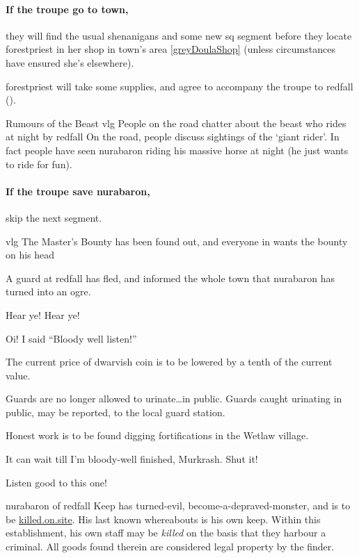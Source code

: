 
\paragraph{If the troupe go to \gls{town},}
they will find the usual shenanigans and some new \gls{sq} \gls{segment} before they locate \gls{forestpriest} in her shop in \gls{town}'s area \vref{greyDoulaShop} (unless circumstances have ensured she's elsewhere).

\Gls{forestpriest} will take some supplies, and agree to accompany the troupe to \gls{redfall} ().

{Rumours of the Beast}%
{\gls{vlg} People on the road chatter about the beast who rides at night by \gls{redfall}}%
On the road, people discuss sightings of the `giant rider'.
In fact people have seen \gls{nurabaron} riding his massive horse at night (he just wants to ride for fun).

\paragraph{If the troupe save \gls{nurabaron},}
skip the next \gls{segment}.

{\gls{vlg} The Master's Bounty}%
{ has been found out, and everyone in  wants the bounty on his head}%
\label{mastersBounty}

A guard at \gls{redfall} has fled, and informed the whole town that \gls{nurabaron} has turned into an ogre.

\begin{speechtext}
    Hear ye! Hear ye!

    Oi! I said ``Bloody well listen!''

    The current price of dwarvish coin is to be lowered by a tenth of the current value.

    Guards are no longer allowed to urinate\ldots in public.
    Guards caught urinating in public, may be reported, to the local {\footnotesize guard station}.

    Honest work is to be found digging fortifications in the Wetlaw village.

    It can wait till I'm bloody-well finished, Murkrash.
    Shut it!

    Listen good to this one!

    \gls{nurabaron} of \gls{redfall} Keep has turned-evil, become-a-depraved-monster, and is to be \underline{\large killed.on.site}.
    His last known whereabouts is his own keep.
    Within this establishment, his own staff may be \emph{killed} on the basis that they harbour a criminal.
    All goods found therein are considered legal property by the finder.
\end{speechtext}

